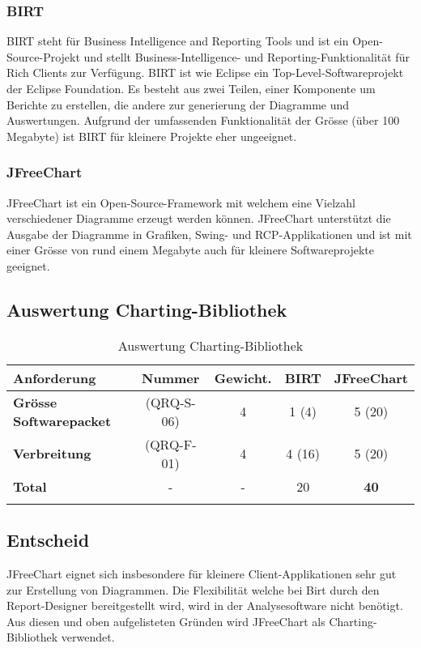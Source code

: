 \subsubsection{BIRT}
BIRT steht für Business Intelligence and Reporting Tools und ist ein Open-Source-Projekt und stellt Business-Intelligence- und Reporting-Funktionalität für Rich Clients zur Verfügung. BIRT ist wie Eclipse ein Top-Level-Softwareprojekt der Eclipse Foundation. Es besteht aus zwei Teilen, einer Komponente um Berichte zu erstellen, die andere zur generierung der Diagramme und Auswertungen. Aufgrund der umfassenden Funktionalität der Grösse (über 100 Megabyte) ist BIRT für kleinere Projekte eher ungeeignet.

\subsubsection{JFreeChart}
JFreeChart ist ein Open-Source-Framework mit welchem eine Vielzahl verschiedener Diagramme erzeugt werden können. JFreeChart unterstützt die Ausgabe der Diagramme in Grafiken, Swing- und RCP-Applikationen und ist mit einer Grösse von rund einem Megabyte auch für kleinere Softwareprojekte geeignet.

\subsection{Auswertung Charting-Bibliothek}
\begin{longtable}{|p{3cm}|c|c|c|c|}\hline
 \textbf{Anforderung} & \textbf{Nummer} &  \textbf{Gewicht.} & \textbf{BIRT} & \textbf{JFreeChart}\\\hline
   \textbf{Grösse Softwarepacket} & (QRQ-S-06) & 4 & 1 (4) & 5 (20) \\\hline
   \textbf{Verbreitung} & (QRQ-F-01) & 4 & 4 (16) & 5 (20) \\\hline
   \textbf{Total} & - & - & 20  & \textbf{40} \\\hline
    \caption{Auswertung Charting-Bibliothek}
\end{longtable}

\subsection{Entscheid}
JFreeChart eignet sich insbesondere für kleinere Client-Applikationen sehr gut zur Erstellung von Diagrammen. Die Flexibilität welche bei Birt durch den Report-Designer bereitgestellt wird, wird in der Analysesoftware nicht benötigt. Aus diesen und oben aufgelisteten Gründen wird JFreeChart als Charting-Bibliothek verwendet.
